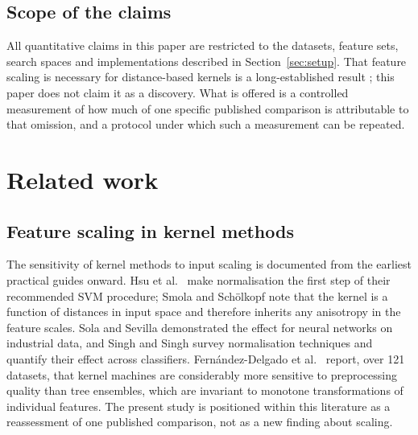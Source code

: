 \documentclass[pdflatex,sn-mathphys-num]{sn-jnl}
\begin{document}
\subsection{Scope of the claims}\label{sec:scope}
All quantitative claims in this paper are restricted to the datasets, feature sets, search spaces and implementations described in Section~\ref{sec:setup}. That feature scaling is necessary for distance-based kernels is a long-established result \cite{sola1997,hsu2003,singh2020}; this paper does not claim it as a discovery. What is offered is a controlled measurement of how much of one specific published comparison is attributable to that omission, and a protocol under which such a measurement can be repeated.

\section{Related work}\label{sec:related}

\subsection{Feature scaling in kernel methods}\label{sec:rw-scaling}
The sensitivity of kernel methods to input scaling is documented from the earliest practical guides onward. Hsu et al.\ \cite{hsu2003} make normalisation the first step of their recommended SVM procedure; Smola and Sch\"olkopf \cite{smola2004} note that the kernel is a function of distances in input space and therefore inherits any anisotropy in the feature scales. Sola and Sevilla \cite{sola1997} demonstrated the effect for neural networks on industrial data, and Singh and Singh \cite{singh2020} survey normalisation techniques and quantify their effect across classifiers. Fern\'andez-Delgado et al.\ \cite{fernandez2014} report, over 121 datasets, that kernel machines are considerably more sensitive to preprocessing quality than tree ensembles, which are invariant to monotone transformations of individual features. The present study is positioned within this literature as a reassessment of one published comparison, not as a new finding about scaling.
\end{document}
